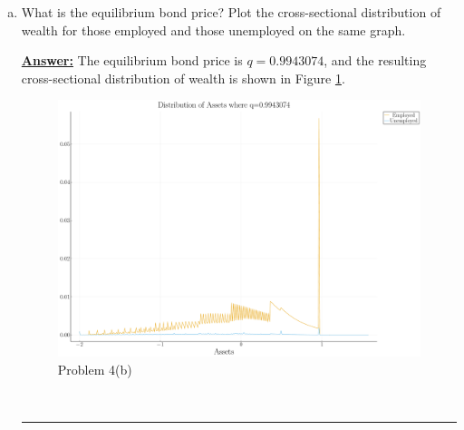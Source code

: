 \documentclass{article} %
\theoremstyle{definition}
\newenvironment{solution}[1][Answer]{\begin{singlespace}\underline{\textbf{#1:}}\quad }{\ \rule{0.3em}{0.3em}\end{singlespace}} %
\begin{document}
\begin{enumerate}[I.]
\begin{enumerate}[4.]
\begin{enumerate}[a.]
				\item What is the equilibrium bond price? Plot the cross-sectional distribution of wealth for those employed and those unemployed on the same graph.
				\begin{solution}
					The equilibrium bond price is $q=0.9943074$, and the resulting cross-sectional distribution of wealth is shown in Figure \ref{4b}.
				\begin{figure}[htbp!]
					\centering
					\includegraphics[scale=.25]{ForIncludingInDocument/02_ryanpubreadyDistribution.pdf}
					\caption{Problem 4(b) \label{4b}}
					\end{figure}
				\end{solution}


\end{enumerate}
\end{enumerate}
\end{enumerate}
\end{document}
